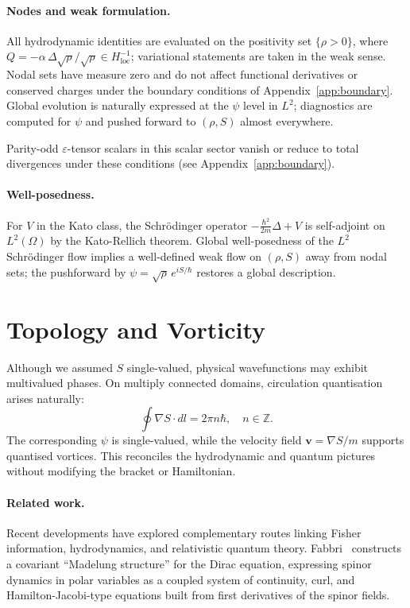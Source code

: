 \documentclass[11pt,a4paper]{article}
\numberwithin{equation}{section}
\theoremstyle{thmcompact}
\theoremstyle{remark}
\begin{document}
\paragraph{Nodes and weak formulation.}
All hydrodynamic identities are evaluated on the positivity set $\{\rho>0\}$, where $Q=-\alpha\,\Delta\sqrt{\rho}/\sqrt{\rho}\in H^{-1}_{\mathrm{loc}}$; variational statements are taken in the weak sense. Nodal sets have measure zero and do not affect functional derivatives or conserved charges under the boundary conditions of Appendix~\ref{app:boundary}. Global evolution is naturally expressed at the $\psi$ level in $L^{2}$; diagnostics are computed for $\psi$ and pushed forward to $(\rho,S)$ almost everywhere.
	
Parity-odd $\varepsilon$-tensor scalars in this scalar sector vanish or reduce to total divergences under these conditions (see Appendix~\ref{app:boundary}).

\paragraph{Well-posedness.}
For $V$ in the Kato class, the Schrödinger operator $-\frac{\hbar^2}{2m}\Delta+V$ is self-adjoint on $L^2(\Omega)$ by the Kato-Rellich theorem. Global well-posedness of the $L^2$ Schrödinger flow implies a well-defined weak flow on $(\rho,S)$ away from nodal sets; the pushforward by $\psi=\sqrt{\rho}\,e^{iS/\hbar}$ restores a global description.

\section{Topology and Vorticity}

Although we assumed $S$ single-valued, physical wavefunctions may exhibit multivalued phases.
On multiply connected domains, circulation quantisation arises naturally:
\[
\oint\nabla S\!\cdot\!dl = 2\pi n\hbar,\quad n\in\mathbb{Z}.
\]
The corresponding $\psi$ is single-valued, while the velocity field $\mathbf{v}=\nabla S/m$ supports quantised vortices.
This reconciles the hydrodynamic and quantum pictures without modifying the bracket or Hamiltonian.
	
\paragraph{Related work.}
Recent developments have explored complementary routes linking Fisher information, hydrodynamics, and relativistic quantum theory.  
Fabbri~\cite{fabbri2025} constructs a covariant ``Madelung structure'' for the Dirac equation, expressing spinor dynamics in polar variables as a coupled system of continuity, curl, and Hamilton-Jacobi-type equations built from first derivatives of the spinor fields. 
\end{document}
